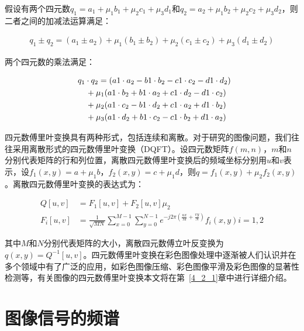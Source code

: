 假设有两个四元数$q_{1}=a_{1}+\mu_{1}b_{1}+\mu_{2}c_{1}+\mu_{3}d_{1}$和$q_{2}=a_{2}+\mu_{1}b_{2}+\mu_{2}c_{2}+\mu_{3}d_{2}$，则二者之间的加减法运算满足：
\begin{linenomath}
\begin{align}
q_{1}\pm q_{2}=(a_{1}\pm a_{2})+\mu_{1}(b_{1}\pm b_{2})+\mu_{2}(c_{1}\pm c_{2})+\mu_{3}(d_{1}\pm d_{2})
\label{式2_31}
\end{align}
\end{linenomath}
两个四元数的乘法满足：
\begin{linenomath}
\begin{align}
\lefteqn{ q_{1}\cdot q_{2}=(a{1}\cdot a_{2}-b{1}\cdot b_{2}-c{1}\cdot c_{2}-d{1}\cdot d_{2}) {}}\nonumber\\
&& {}+\mu_{1}(a{1}\cdot b_{2}+b{1}\cdot a_{2}+c{1}\cdot d_{2}-d{1}\cdot c_{2})\nonumber\\
&& {}+\mu_{2}(a{1}\cdot c_{2}-b{1}\cdot d_{2}+c{1}\cdot a_{2}+d{1}\cdot b_{2})\nonumber\\
&& {}+\mu_{3}(a{1}\cdot d_{2}+b{1}\cdot c_{2}-c{1}\cdot b_{2}+d{1}\cdot a_{2})
\label{式2_32}
\end{align}
\end{linenomath}

四元数傅里叶变换具有两种形式，包括连续和离散。对于研究的图像问题，我们往往采用离散形式的四元数傅里叶变换（DQFT）。设四元数矩阵$f(m,n)$，$m$和$n$分别代表矩阵的行和列位置，离散四元数傅里叶变换后的频域坐标分别用$u$和$v$表示，设$f_{1}(x,y)=a+\mu_{1} b$，$f_{2}(x,y)=c+\mu_{1} d$，则$q=f_{1}(x,y)+\mu_{2}f_{2}(x,y)$。离散四元数傅里叶变换的表达式为：
\begin{linenomath}
\begin{align}
Q[u,v] &= F_{1}[u,v]+F_{2}[u,v]\mu_{2}\label{式2_33}\\
F_{i}[u,v] &= \frac{1}{\sqrt{MN}}\sum_{x=0}^{M-1}\sum_{y=0}^{N-1}e^{-j2\pi (\frac{ux}{M}+\frac{vy}{N})}f_{i}(x,y)  i=1,2\label{式2_34}
\end{align}
\end{linenomath}
其中$M$和$N$分别代表矩阵的大小，离散四元数傅立叶反变换为$q(x,y)=Q^{-1}[u,v]$。四元数傅里叶变换在彩色图像处理中逐渐被人们认识并在多个领域中有了广泛的应用，如彩色图像压缩、彩色图像平滑及彩色图像的显著性检测等，有关图像的四元数傅里叶变换本文将在第~\ref{4_2_1}章中进行详细介绍。
\section{图像信号的频谱}
\label{2_3}

